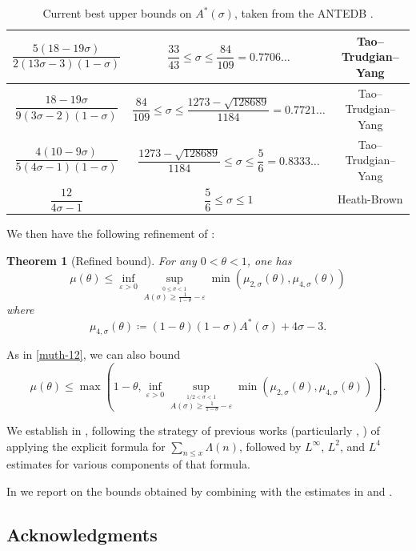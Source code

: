 \documentclass[12pt]{amsart}
\newtheorem{theorem}{Theorem}[section]
\newcommand{\eps}{\varepsilon}
\begin{document}
\begin{table}[ht]
\begin{tabular}{|c|c|c|}
    \hline
    $\dfrac{5(18 - 19\sigma)}{2(13\sigma - 3)(1 - \sigma)}$ & $\dfrac{33}{43} \leq \sigma \le \dfrac{84}{109} = 0.7706\ldots$ & Tao--Trudgian--Yang \cite{tty}\\
    \hline
    $\dfrac{18 - 19\sigma}{9(3\sigma - 2)(1 - \sigma)}$ & $\dfrac{84}{109} \leq \sigma \le \dfrac{1273 - \sqrt{128689}}{1184} = 0.7721\ldots$ & Tao--Trudgian--Yang \cite{tty}\\
    \hline
    $\dfrac{4(10 - 9\sigma)}{5(4\sigma - 1)(1 - \sigma)}$ & $\dfrac{1273 - \sqrt{128689}}{1184} \leq \sigma \le \dfrac{5}{6} = 0.8333\ldots$ & Tao--Trudgian--Yang \cite{tty}\\
    \hline
    $\dfrac{12}{4\sigma - 1}$ & $\dfrac{5}{6} \leq \sigma \le 1$ & Heath-Brown \cite{HB-2}\\
    \hline
    \end{tabular}
 
    \caption{Current best upper bounds on $A^*(\sigma)$, taken from the ANTEDB \cite{antedb}.}   \label{zero-density-energy-table}
\end{table}

We then have the following refinement of :

\begin{theorem}[Refined bound]\label{refined-bound}  For any $0 < \theta < 1$, one has
$$ \mu(\theta) \leq \inf_{\eps>0} \sup_{\stackrel{0 \leq \sigma < 1}{A(\sigma) \geq \frac{1}{1-\theta}-\eps}} \min( \mu_{2,\sigma}(\theta), \mu_{4,\sigma}(\theta))$$
where
$$ \mu_{4,\sigma}(\theta) \coloneqq (1-\theta)(1-\sigma) A^*(\sigma) + 4\sigma-3.$$
\end{theorem}

As in \eqref{muth-12}, we can also bound
$$ \mu(\theta) \leq \max\left(1-\theta, \inf_{\eps>0} \sup_{\stackrel{1/2 < \sigma < 1}{A(\sigma) \geq \frac{1}{1-\theta}-\eps}} \min( \mu_{2,\sigma}(\theta), \mu_{4,\sigma}(\theta)) \right).$$

We establish  in , following the strategy of previous works (particularly \cite{HB-2}, \cite{baz-2}) of applying the explicit formula for $\sum_{n \leq x} \Lambda(n)$, followed by $L^\infty$, $L^2$, and $L^4$ estimates for various components of that formula.

In  we report on the bounds obtained by combining  with the estimates in  and .



\subsection{Acknowledgments}
\end{document}
